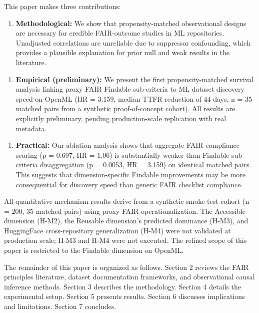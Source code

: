This paper makes three contributions:

\begin{enumerate}
\item \textbf{Methodological:} We show that propensity-matched observational designs are necessary for credible FAIR-outcome studies in ML repositories. Unadjusted correlations are unreliable due to suppressor confounding, which provides a plausible explanation for prior null and weak results in the literature.
\end{enumerate}

\begin{enumerate}
\item \textbf{Empirical (preliminary):} We present the first propensity-matched survival analysis linking proxy FAIR Findable sub-criteria to ML dataset discovery speed on OpenML (HR = 3.159, median TTFR reduction of 44 days, n = 35 matched pairs from a synthetic proof-of-concept cohort). All results are explicitly preliminary, pending production-scale replication with real metadata.
\end{enumerate}

\begin{enumerate}
\item \textbf{Practical:} Our ablation analysis shows that aggregate FAIR compliance scoring (p = 0.697, HR = 1.06) is substantially weaker than Findable sub-criteria disaggregation (p = 0.0053, HR = 3.159) on identical matched pairs. This suggests that dimension-specific Findable improvements may be more consequential for discovery speed than generic FAIR checklist compliance.
\end{enumerate}

All quantitative mechanism results derive from a synthetic smoke-test cohort (n = 200, 35 matched pairs) using proxy FAIR operationalization. The Accessible dimension (H-M2), the Reusable dimension's predicted dominance (H-M3), and HuggingFace cross-repository generalization (H-M4) were not validated at production scale; H-M3 and H-M4 were not executed. The refined scope of this paper is restricted to the Findable dimension on OpenML.

The remainder of this paper is organized as follows. Section 2 reviews the FAIR principles literature, dataset documentation frameworks, and observational causal inference methods. Section 3 describes the methodology. Section 4 details the experimental setup. Section 5 presents results. Section 6 discusses implications and limitations. Section 7 concludes.

